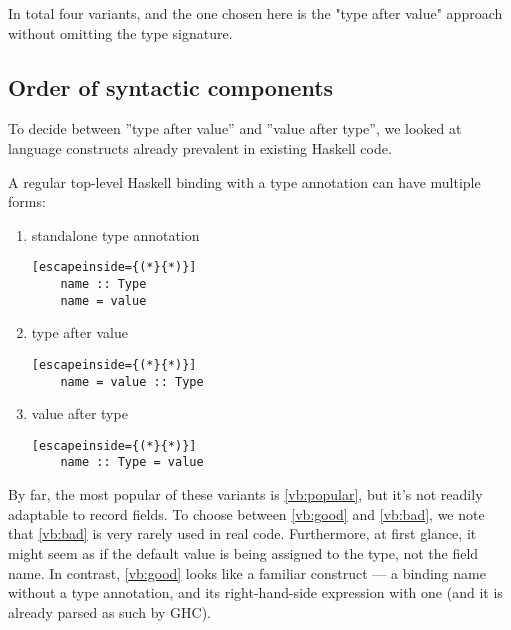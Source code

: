 \documentclass[en]{pracamgr}
\begin{document}
In total four variants, and the one chosen here is the "type after value" approach without omitting the type signature.
\subsection{Order of syntactic components}
To decide between ''type after value'' and ''value after type'', we looked at language constructs already prevalent in existing Haskell code.

A regular top-level Haskell binding with a type annotation can have multiple forms:
\begin{enumerate}
  \item \label{vb:popular} standalone type annotation
  \begin{lstlisting}[escapeinside={(*}{*)}]
    name :: Type 
    name = value
  \end{lstlisting}
  \item \label{vb:good} type after value
  \begin{lstlisting}[escapeinside={(*}{*)}]
    name = value :: Type
  \end{lstlisting}  
  \item \label{vb:bad} value after type
  \begin{lstlisting}[escapeinside={(*}{*)}]
    name :: Type = value
  \end{lstlisting}
\end{enumerate}

By far, the most popular of these variants is \ref*{vb:popular}, but it's not readily adaptable to record fields.
To choose between \ref*{vb:good} and \ref*{vb:bad}, we note that \ref*{vb:bad} is very rarely used in real code.
Furthermore, at first glance, it might seem as if the default value is being assigned to the type, not the field name.
In contrast, \ref*{vb:good} looks like a familiar construct --- a binding name without a type annotation, and its right-hand-side expression with one (and it is already parsed as such by GHC).
\end{document}
